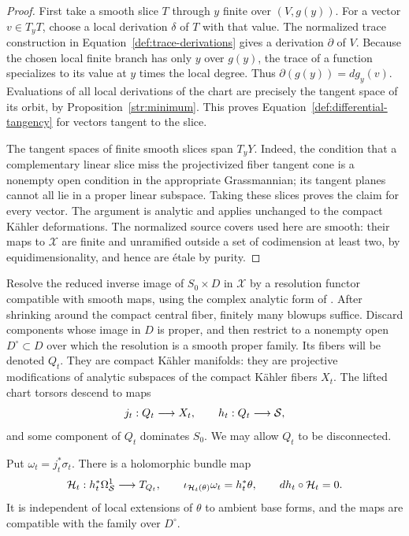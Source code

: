 \begin{proof}
First take a smooth slice $T$ through $y$ finite over $(V,g(y))$.
For a vector $v\in T_yT$, choose a local derivation $\delta$ of
$T$ with that value.  The normalized trace construction in
Equation~\eqref{def:trace-derivations} gives a derivation
$\partial$ of $V$.  Because the chosen local finite branch has
only $y$ over $g(y)$, the trace of a function specializes to its
value at $y$ times the local degree.  Thus
$\partial(g(y))=dg_y(v)$.  Evaluations of all local derivations of
the chart are precisely the tangent space of its orbit, by
Proposition~\ref{str:minimum}.  This proves
Equation~\eqref{def:differential-tangency} for vectors tangent to
the slice.

The tangent spaces of finite smooth slices span $T_yY$.
Indeed, the condition that a complementary linear slice miss the
projectivized fiber tangent cone is a nonempty open condition in
the appropriate Grassmannian; its tangent planes cannot all lie
in a proper linear subspace.  Taking these slices proves the
claim for every vector.  The argument is analytic and applies
unchanged to the compact K\"ahler deformations.  The normalized
source covers used here are smooth: their maps to $\mathcal X$
are finite and unramified outside a set of codimension at least
two, by equidimensionality, and hence are \'etale by purity.
\end{proof}

Resolve the reduced inverse image of $S_0\times D$ in $\mathcal X$
by a resolution functor compatible with smooth maps, using the
complex analytic form of \cite[Theorem~1.1]{BierstoneMilman2008}.
After shrinking around the compact central fiber, finitely many
blowups suffice.  Discard components
whose image in $D$ is proper, and then restrict to a nonempty open
$D^\circ\subset D$ over which the resolution is a smooth proper
family.  Its fibers will be denoted $Q_t$.  They are compact
K\"ahler manifolds: they are projective modifications of analytic
subspaces of the compact K\"ahler fibers $X_t$.
The lifted chart torsors descend to maps
\[
       j_t:Q_t\longrightarrow X_t,
       \qquad h_t:Q_t\longrightarrow\mathcal S,
\]
and some component of $Q_t$ dominates $S_0$.
We may allow $Q_t$ to be disconnected.

\begin{lemma}\label{def:hamiltonian}
Put $\omega_t=j_t^*\sigma_t$.  There is a holomorphic bundle map
\begin{equation}\label{def:hamiltonian-equations}
 \mathcal H_t:h_t^*\Omega^1_{\mathcal S}\longrightarrow T_{Q_t},
 \qquad
 \iota_{\mathcal H_t(\theta)}\omega_t=h_t^*\theta,
 \qquad dh_t\circ\mathcal H_t=0.
\end{equation}
It is independent of local extensions of $\theta$ to ambient base
forms, and the maps are compatible with the family over $D^\circ$.
\end{lemma}

